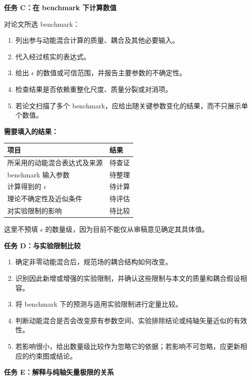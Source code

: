 \documentclass[
]{article}
\providecommand{\tightlist}{%
  \setlength{\itemsep}{0pt}\setlength{\parskip}{0pt}}
\begin{document}
\textbf{任务 C：在 benchmark 下计算数值}

对论文所选 benchmark：

\begin{enumerate}
\def\labelenumi{\arabic{enumi}.}
\tightlist
\item
  列出参与动能混合计算的质量、耦合及其他必要输入。
\item
  代入经过核实的表达式。
\item
  给出 \(\epsilon\) 的数值或可信范围，并报告主要参数的不确定性。
\item
  检查结果是否依赖重整化尺度、质量分裂或对消项。
\item
  若论文扫描了多个
  benchmark，应给出随关键参数变化的结果，而不只展示单个数值。
\end{enumerate}

\textbf{需要填入的结果：}

\begin{longtable}[]{@{}ll@{}}
\toprule\noalign{}
项目 & 结果 \\
\midrule\noalign{}
\endhead
\bottomrule\noalign{}
\endlastfoot
所采用的动能混合表达式及来源 & 待查证 \\
benchmark 输入参数 & 待整理 \\
计算得到的 \(\epsilon\) & 待计算 \\
理论不确定性及近似条件 & 待评估 \\
对实验限制的影响 & 待比较 \\
\end{longtable}

这里不预填 \(\epsilon\) 的数量级，因为目前不能仅从审稿意见确定其具体值。

\textbf{任务 D：与实验限制比较}

\begin{enumerate}
\def\labelenumi{\arabic{enumi}.}
\tightlist
\item
  确定非零动能混合后，规范场的耦合结构如何改变。
\item
  识别因此新增或增强的实验限制，并确认这些限制与本文的质量和耦合假设相容。
\item
  将 benchmark 下的预测与适用实验限制进行定量比较。
\item
  判断动能混合是否会改变原有参数空间、实验排除结论或纯轴矢量近似的有效性。
\item
  若影响很小，给出数量级比较作为忽略它的依据；若影响不可忽略，应更新相应的约束图或结论。
\end{enumerate}

\textbf{任务 E：解释与纯轴矢量极限的关系}
\end{document}
